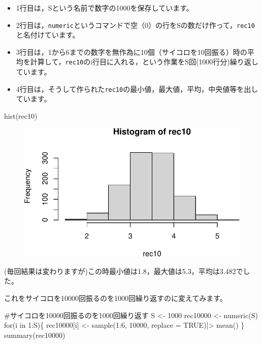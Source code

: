 \documentclass[
  letterpaper,
  DIV=11,
  numbers=noendperiod]{scrreprt}
\newenvironment{Shaded}{\begin{snugshade}}{\end{snugshade}}
\newcommand{\AttributeTok}[1]{\textcolor[rgb]{0.40,0.45,0.13}{#1}}
\newcommand{\CommentTok}[1]{\textcolor[rgb]{0.37,0.37,0.37}{#1}}
\newcommand{\ConstantTok}[1]{\textcolor[rgb]{0.56,0.35,0.01}{#1}}
\newcommand{\ControlFlowTok}[1]{\textcolor[rgb]{0.00,0.23,0.31}{#1}}
\newcommand{\DecValTok}[1]{\textcolor[rgb]{0.68,0.00,0.00}{#1}}
\newcommand{\FunctionTok}[1]{\textcolor[rgb]{0.28,0.35,0.67}{#1}}
\newcommand{\NormalTok}[1]{\textcolor[rgb]{0.00,0.23,0.31}{#1}}
\newcommand{\OtherTok}[1]{\textcolor[rgb]{0.00,0.23,0.31}{#1}}
\newcommand{\SpecialCharTok}[1]{\textcolor[rgb]{0.37,0.37,0.37}{#1}}
\providecommand{\tightlist}{%
  \setlength{\itemsep}{0pt}\setlength{\parskip}{0pt}}\usepackage{longtable,booktabs,array}
\begin{document}
\begin{itemize}
\tightlist
\item
  1行目は，Sという名前で数字の1000を保存しています。
\item
  2行目は，\texttt{numeric}というコマンドで空（0）の行をSの数だけ作って，\texttt{rec10}と名付けています。
\item
  3行目は，1から6までの数字を無作為に10個（サイコロを10回振る）時の平均を計算して，\texttt{rec10}のi行目に入れる，という作業をS回(1000行分)繰り返しています。
\item
  4行目は，そうして作られた\texttt{rec10}の最小値，最大値，平均，中央値等を出しています。
\end{itemize}

\begin{Shaded}
\begin{Highlighting}[]
\FunctionTok{hist}\NormalTok{(rec10)}
\end{Highlighting}
\end{Shaded}

\begin{figure}[H]

{\centering \includegraphics{6_hyohon_files/figure-pdf/unnamed-chunk-4-1.pdf}

}

\end{figure}

(毎回結果は変わりますが)この時最小値は1.8，最大値は5.3，平均は3.482でした。

これをサイコロを10000回振るのを1000回繰り返すのに変えてみます。

\begin{Shaded}
\begin{Highlighting}[]
\CommentTok{\#サイコロを10000回振るのを1000回繰り返す}
\NormalTok{S }\OtherTok{\textless{}{-}} \DecValTok{1000}
\NormalTok{rec10000 }\OtherTok{\textless{}{-}} \FunctionTok{numeric}\NormalTok{(S)}
\ControlFlowTok{for}\NormalTok{(i }\ControlFlowTok{in} \DecValTok{1}\SpecialCharTok{:}\NormalTok{S)\{}
\NormalTok{  rec10000[i] }\OtherTok{\textless{}{-}} \FunctionTok{sample}\NormalTok{(}\DecValTok{1}\SpecialCharTok{:}\DecValTok{6}\NormalTok{, }\DecValTok{10000}\NormalTok{, }\AttributeTok{replace =} \ConstantTok{TRUE}\NormalTok{)}\SpecialCharTok{|\textgreater{}}
    \FunctionTok{mean}\NormalTok{()}
\NormalTok{\}}
\FunctionTok{summary}\NormalTok{(rec10000)}
\end{Highlighting}
\end{Shaded}
\end{document}

